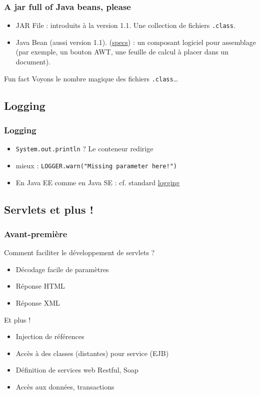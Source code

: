 \documentclass[english, french]{beamer}
\begin{document}
\begin{frame}
	\frametitle{A jar full of Java beans, please}
	\begin{itemize}
		\item JAR File : introduits à la version 1.1. Une collection de fichiers \texttt{.class}.
		\item Java Bean (aussi version 1.1). (\href{http://www.oracle.com/technetwork/java/javase/documentation/spec-136004.html}{specs}) : un composant logiciel pour assemblage (par exemple, un bouton AWT, une feuille de calcul à placer dans un document).
	\end{itemize}
	\begin{block}{Fun fact}
		Voyons le nombre magique des fichiers \texttt{.class}…
	\end{block}
\end{frame}

\subsection{Logging}
\begin{frame}
	\frametitle{Logging}
	\begin{itemize}
		\item \texttt{System.out.println} ? \pause Le conteneur redirige\pause
		\item \alert{mieux} : \texttt{LOGGER.warn("Missing parameter here!")}
		\item En Java EE comme en Java SE : cf. standard \href{http://docs.oracle.com/javase/8/docs/technotes/guides/logging/index.html}{logging}
	\end{itemize}
\end{frame}

\subsection{Servlets et plus !}
\begin{frame}
	\frametitle{Avant-première}
	Comment faciliter le développement de servlets ?\pause
	\begin{itemize}
		\item Décodage facile de paramètres
		\item Réponse HTML
		\item Réponse XML
	\end{itemize}
	\pause
	\begin{block}{Et plus !}
		\begin{itemize}
			\item Injection de références
			\item Accès à des classes (distantes) pour service (EJB)
			\item Définition de services web Restful, Soap
			\item Accès aux données, transactions
		\end{itemize}
	\end{block}
\end{frame}
\end{document}
